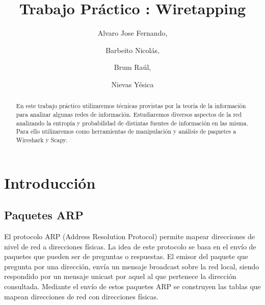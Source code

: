 \documentclass[final,inline,narroweqnarray,a4paper]{ieee}
\begin{document}
\title[TP1: Wiretapping]{%
Trabajo Práctico : Wiretapping}

\author[Alvaro, Barbeito, Brum, Nievas]{%
	Alvaro Jose Fernando, 
	\and
	Barbeito Nicolás,
	\and
	Brum Raúl,
	\and
	Nievas Yésica
}

\maketitle

\begin{abstract}
En este trabajo práctico utilizaremos técnicas provistas por la teoría de la información para
analizar algunas redes de información. Estudiaremos diversos aspectos de la red analizando la entropía y probabilidad de distintas fuentes de información en las misma. Para ello utilizaremos como herramientas de manipulación y análisis de paquetes a Wireshark y Scapy.
\end{abstract}

\section{Introducción}\label{sec:intro}

\subsection{Paquetes ARP}
El protocolo ARP (Address Resolution Protocol) permite mapear direcciones de nivel de red a direcciones físicas. La idea de este protocolo se basa en el envío de paquetes que pueden ser de preguntas o respuestas. El emisor del paquete que pregunta por una dirección, envía un mensaje broadcast sobre la red local, siendo respondido por un mensaje unicast por aquel al que pertenece la dirección consultada. Mediante el envío de estos paquetes ARP se construyen las tablas que mapean direcciones de red con direcciones físicas.
\end{document}
